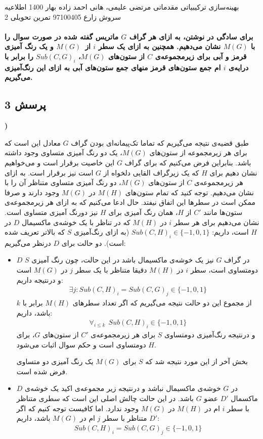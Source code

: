 \documentclass[a4paper,12pt]{article}
\newcounter{problemcounter}
\newcounter{subproblemcounter}
\newcommand{\problem}[1]
{
	\subsection*{
		پرسش
		#1
	}
}
\newcommand{\subproblem}{
	\textbf{\harfi{subproblemcounter})}\stepcounter{subproblemcounter}
}
\begin{document}
\handout
{بهینه‌سازی ترکیبیاتی مقدماتی}
{مرتضی علیمی، هانی احمد زاده}
{بهار 1400}
{اطلاعیه}
{سروش زارع}
{97100405}
 {تمرین تحویلی 2}

\paragraph{\color{red}برای سادگی در نوشتن، به ازای هر گراف $G$ ماتریس گفته شده در صورت سوال را با
$M(G)$
نشان می‌دهیم. 
همچنین به ازای یک سطر $i$ از $M(G)$ و یک رنگ آمیزی قرمز و آبی برای زیرمجموعه‌ی $C$ از ستون‌های
$M(G)$، 
$Sub(C, G)_i$
را برابر با درایه‌ی $i$ ام جمع‌ ستون‌های قرمز منهای جمع ستون‌های آبی به ازای این رنگ‌آمیزی می‌گیریم.
}
\problem{3}
\subproblem
طبق قضیه‌ی 
نتیجه می‌گیریم که تماما تک‌پیمانه‌ای بودن گراف $G$ معادل این است که برای هر زیرمجموعه از ستون‌های $M(G)$،  یک دو رنگ آمیزی متساوی وجود داشته باشد. بنابراین فرض می‌کنیم که برای گراف $G$ این خاصیت برقرار است و می‌خواهیم نشان دهیم برای $H$ که یک زیرگراف القایی دلخواه از $G$ است نیز برقرار است. 
به ازای هر زیرمجموعه‌ی $C$ از ستون‌های $M(G)$، دو رنگ آمیزی متساوی متناظر آن را با 
نشان می‌دهیم. توجه کنید که تمام ستون‌های $M(H)$ در $M(G)$ وجود دارند و صرفا ممکن است در سطر‌ها این اتفاق نیفتد. حال ادعا می‌کنیم که به ازای هر زیرمجموعه‌ی ستون‌ها مانند $C'$ از $H$، همان رنگ آمیزی
برای
$H$
نیز دورنگ آمیزی متساوی است.
\newline
\proof{}
نشان می‌دهیم برای هر سطر $i$ در $M(H)$ که در تناظر با یک خوشه‌ی ماکسیمال $D$ در $H$ است، داریم: 
$Sub(C, H)_i \in \{-1,0,1\}$
(به ازای رنگ‌آمیزی $S$ که بالاتر تعریف شده است).
دو حالت برای $D$ درنظر می‌گیریم:
\begin{itemize}
	\item $D$ در گراف $G$ نیز یک خوشه‌ی ماکسیمال باشد \newline \newline
در این حالت، چون رنگ آمیزی $S$ دومتساوی است، سطر $i$ در $M(H)$ دقیقا متناظر با یک سطر $j$ در $M(G)$ است و درنتیجه داریم:
\begin{align*}
	\exists j: Sub(C, H)_i = Sub(C, G)_j \in \{-1,0,1\}
\end{align*}
از مجموع این دو حالت نتیجه می‌گیریم که اگر تعداد سطر‌های $M(H)$ برابر با $k$ باشد، داریم:
\begin{align*}
	\forall_{i \leq k} \ \ Sub(C, H)_i \in \{-1,0,1\}
\end{align*}
و درنتیجه رنگ‌آمیزی دومتساوی $S$ برای هر زیرمجموعه‌ی $C'$ از ستون‌های $G$، برای $H$  دومتساوی است و حکم سوال اثبات می‌شود.

بخش آخر از این مورد نتیجه شد که $S$ برای $M(G)$ یک رنگ آمیزی دو متساوی فرض شده است.
	\item $D$ در $G$ خوشه‌ی ماکسیمال نباشد و درنتیجه زیر مجموعه‌ی اکید یک خوشه‌ی ماکسمال $D'$ عضو $G$ باشد. \newline \newline
در این حالت چالش اصلی این است که سطری متناظر با سطر $i$ ام در $M(H)$ در $M(G)$ وجود ندارد. اما کافیست توجه کنیم که اگر $D'$ متناظر با سطر $j$ ام در $M(G)$ باشد، داریم:
\begin{align*}
	Sub(C, H)_i = Sub(C, G)_j \in \{-1,0,1\}
\end{align*}
\end{itemize}
\end{document}
